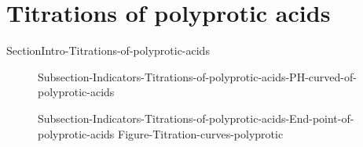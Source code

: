 \documentclass[main.tex]{subfiles}
\newcommand\chapterlabel{Ch-acidbase}\setcounter{figurenewcounter}{0}\setcounter{tablenewcounter}{0}\setcounter{formulanewcounter}{0}\chapterpicture{../{\chapterlabel}/figure1}\chapterpicturelabel{PngImg}
\begin{document}
{\section{Titrations of polyprotic acids}{SectionIntro-Titrations-of-polyprotic-acids}
\sloppy\begin{description}
\item[] {Subsection-Indicators-Titrations-of-polyprotic-acids-PH-curved-of-polyprotic-acids}
\item[] {Subsection-Indicators-Titrations-of-polyprotic-acids-End-point-of-polyprotic-acids}
 {Figure-Titration-curves-polyprotic}
 \end{description}
}
 
\checkoddpage\ifoddpage \clearpage\thispagestyle{empty}\mbox{}\clearpage \else  \fi 
\end{document}
